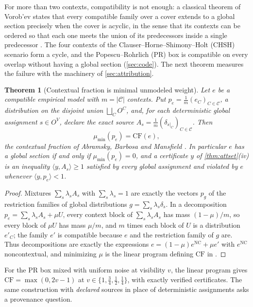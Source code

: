\documentclass[11pt]{article}
\newtheorem{theorem}{Theorem}[section]
\theoremstyle{definition}
\theoremstyle{remark}
\begin{document}
For more than two contexts, compatibility is not enough: a classical theorem of Vorob'ev states that
every compatible family over a cover extends to a global section precisely when the cover is
acyclic, in the sense that its contexts can be ordered so that each one meets the union of its
predecessors inside a single predecessor \cite{Vorobev1962}. The four contexts of the
Clauser--Horne--Shimony--Holt (CHSH) scenario form a cycle, and the Popescu--Rohrlich (PR) box is
compatible on every overlap without having a global section (\cref{sec:code}). The next theorem measures
the failure with the machinery of \cref{sec:attribution}.

\begin{theorem}[Contextual fraction is minimal unmodeled weight]\label{thm:cf}
Let $e$ be a compatible empirical model with $m=\lvert\mathcal C\rvert$ contexts. Put
$p_e=\tfrac1m(e_C)_{C\in\mathcal C}$, a distribution on the disjoint union $\bigsqcup_CO^C$, and, for each
deterministic global assignment $s\in O^V$, declare the exact source
$A_s=\tfrac1m(\delta_{s|_C})_{C\in\mathcal C}$. Then
\[
\mu_{\min}(p_e)=\mathrm{CF}(e),
\]
the contextual fraction of Abramsky, Barbosa and Mansfield \cite{ABM2017}. In particular $e$ has a
global section if and only if $\mu_{\min}(p_e)=0$, and a certificate $y$ of \cref{thm:attset}(iv) is
an inequality $\langle y,A_s\rangle\ge1$ satisfied by every global assignment and violated by $e$
whenever $\langle y,p_e\rangle<1$.
\end{theorem}
\begin{proof}
Mixtures $\sum_s\lambda_sA_s$ with $\sum_s\lambda_s=1$ are exactly the vectors $p_g$ of the restriction
families of global distributions $g=\sum_s\lambda_s\delta_s$. In a decomposition
$p_e=\sum_s\lambda_sA_s+\mu U$, every context block of $\sum_s\lambda_sA_s$ has mass
$(1-\mu)/m$, so every block of $\mu U$ has mass $\mu/m$, and $m$ times each block of $U$ is a distribution $e'_C$; the family $e'$ is
compatible because $e$ and the restriction family of $g$ are. Thus decompositions are exactly the
expressions $e=(1-\mu)e^{\mathrm{NC}}+\mu e'$ with $e^{\mathrm{NC}}$ noncontextual, and minimizing $\mu$
is the linear program defining $\mathrm{CF}$ in \cite{ABM2017}.
\end{proof}

For the PR box mixed with uniform noise at visibility $v$, the linear program gives
$\mathrm{CF}=\max(0,2v-1)$ at $v\in\{1,\tfrac34,\tfrac12,\tfrac14\}$, with exactly verified
certificates. The same construction with \emph{declared} sources in place of deterministic
assignments asks a provenance question.
\end{document}
